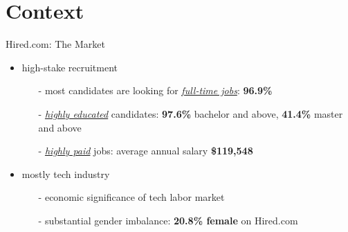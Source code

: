 \section{Context}
    
\frame{\sectionpage}

\begin{frame}{Hired.com: The Market}
    \begin{itemize}
        \item<+-> high-stake recruitment
        \begin{itemize}
            \item[-] most candidates are looking for \textit{\underline{full-time jobs}}: \textcolor{frenchlilac!45!white}{\textbf{96.9\%}} 
            \item[-] \textit{\underline{highly educated}} candidates: \textcolor{frenchlilac!45!white}{\textbf{97.6\%}} bachelor {\tiny and above}, \textcolor{frenchlilac!45!white}{\textbf{41.4\%}} master {\tiny and above}
            \item[-] \textit{\underline{highly paid}} jobs: average annual salary \textcolor{frenchlilac!45!white}{\textbf{\$119,548}}
        \end{itemize} 
        \item<+-> mostly tech industry
        \begin{itemize}
            \item[-] economic significance of tech labor market
            \item[-] substantial gender imbalance: \textcolor{frenchlilac!45!white}{\textbf{20.8\% female}} on Hired.com
        \end{itemize}
    \end{itemize}
\end{frame}


